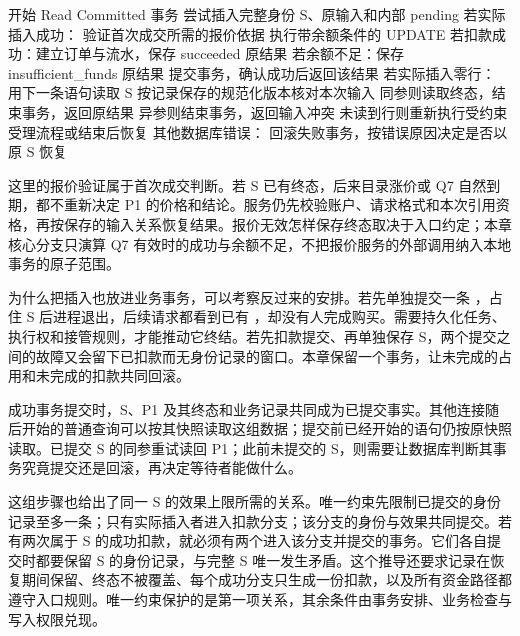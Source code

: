 \begin{BookCode}
开始 Read Committed 事务
尝试插入完整身份 S、原输入和内部 pending
若实际插入成功：
    验证首次成交所需的报价依据
    执行带余额条件的 UPDATE
    若扣款成功：建立订单与流水，保存 succeeded 原结果
    若余额不足：保存 insufficient_funds 原结果
    提交事务，确认成功后返回该结果
若实际插入零行：
    用下一条语句读取 S
    按记录保存的规范化版本核对本次输入
    同参则读取终态，结束事务，返回原结果
    异参则结束事务，返回输入冲突
    未读到行则重新执行受约束受理流程或结束后恢复
其他数据库错误：
    回滚失败事务，按错误原因决定是否以原 S 恢复
\end{BookCode}

这里的报价验证属于首次成交判断。若 S 已有终态，后来目录涨价或 Q7 自然到期，都不重新决定 P1 的价格和结论。服务仍先校验账户、请求格式和本次引用资格，再按保存的输入关系恢复结果。报价无效怎样保存终态取决于入口约定；本章核心分支只演算 Q7 有效时的成功与余额不足，不把报价服务的外部调用纳入本地事务的原子范围。



为什么把插入也放进业务事务，可以考察反过来的安排。若先单独提交一条 ，占住 S 后进程退出，后续请求都看到已有 ，却没有人完成购买。需要持久化任务、执行权和接管规则，才能推动它终结。若先扣款提交、再单独保存 S，两个提交之间的故障又会留下已扣款而无身份记录的窗口。本章保留一个事务，让未完成的占用和未完成的扣款共同回滚。

成功事务提交时，S、P1 及其终态和业务记录共同成为已提交事实。其他连接随后开始的普通查询可以按其快照读取这组数据；提交前已经开始的语句仍按原快照读取。已提交 S 的同参重试读回 P1；此前未提交的 S，则需要让数据库判断其事务究竟提交还是回滚，再决定等待者能做什么。

这组步骤也给出了同一 S 的效果上限所需的关系。唯一约束先限制已提交的身份记录至多一条；只有实际插入者进入扣款分支；该分支的身份与效果共同提交。若有两次属于 S 的成功扣款，就必须有两个进入该分支并提交的事务。它们各自提交时都要保留 S 的身份记录，与完整 S 唯一发生矛盾。这个推导还要求记录在恢复期间保留、终态不被覆盖、每个成功分支只生成一份扣款，以及所有资金路径都遵守入口规则。唯一约束保护的是第一项关系，其余条件由事务安排、业务检查与写入权限兑现。
\FloatBarrier
